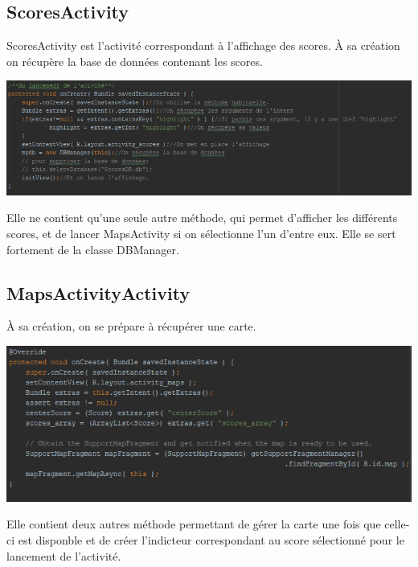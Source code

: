 \documentclass{article}
\begin{document}
\subsection{ScoresActivity}
\label{subsection:2_4}
ScoresActivity est l'activité correspondant à l'affichage des scores.
\`A sa création on récupère la base de données contenant les scores.
\begin{center}
  \includegraphics[scale=0.5]{ScoresActivity_onCreate.png}
\end{center}
Elle ne contient qu'une seule autre méthode, qui permet d'afficher les différents scores, et de lancer MapsActivity si on sélectionne l'un d'entre eux. Elle se sert fortement de la classe DBManager.

\subsection{MapsActivityActivity}
\label{subsection:2_5}
\`A sa création, on se prépare à récupérer une carte.
\begin{center}
  \includegraphics[scale=0.5]{MapsActivity_onCreate.png}
\end{center}
Elle contient deux autres méthode permettant de gérer la carte une fois que celle-ci est disponble et de créer l'indicteur correspondant au score sélectionné pour le lancement de l'activité.

%
%
\end{document}
